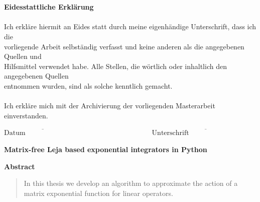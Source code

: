 \documentclass{scrartcl}
\begin{document}
{\begin{figure}[!htp]
\begin{flushright}
			\end{flushright}
		\end{figure}\\\\
		{\Large\textbf{Eidesstattliche Erklärung}}\\\\
		Ich erkläre hiermit an Eides statt durch meine eigenhändige Unterschrift, dass ich die\\ vorliegende Arbeit selbständig verfasst und keine anderen als die angegebenen Quellen und\\ Hilfsmittel verwendet habe. Alle Stellen, die wörtlich oder inhaltlich den angegebenen Quellen \\entnommen wurden, sind als solche kenntlich gemacht.\\\\
		Ich erkläre mich mit der Archivierung der vorliegenden Masterarbeit einverstanden.
		\vspace{40pt}\\
		\begin{center}
			\ensuremath{\overline{\mbox{Datum}\hspace{8em}}
				\hspace{10em}
				\overline{\mbox{Unterschrift}\hspace{10em}}
			}
			\thispagestyle{empty}
	\end{center}}
	\pagebreak
	
	
	
	\begin{center}\textbf{\Huge Matrix-free Leja based exponential integrators in Python}\end{center}
	\begin{center}\textbf{Abstract}\end{center}
	\begin{abstract}
		In this thesis we develop an algorithm to approximate the action of a matrix exponential function for linear operators. 
	\end{abstract}
	
	\setcounter{page}{1}
	
\end{document}
